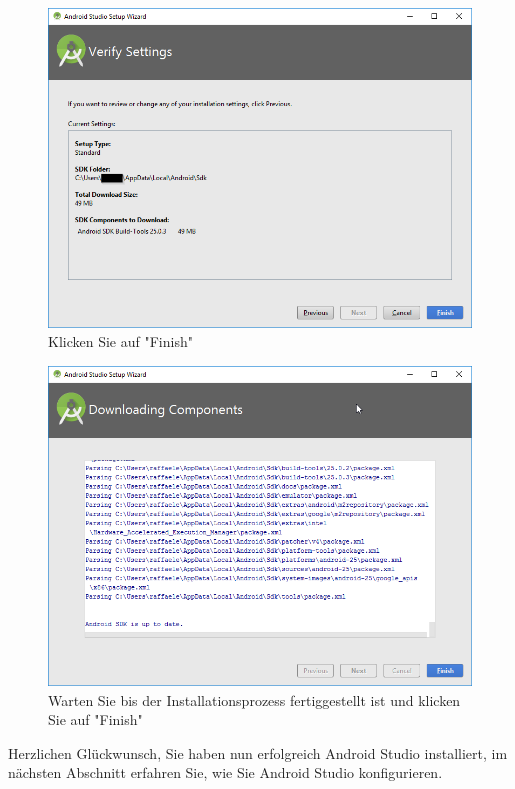 \documentclass[a4paper,10pt,xetex]{article}
\begin{document}
\begin{figure}
  \centering
  \includegraphics[width=\textwidth]{Installation/1-13}
  \caption{Klicken Sie auf "Finish"}
\end{figure}

\begin{figure}
  \centering
  \includegraphics[width=\textwidth]{Installation/1-15}
  \caption{Warten Sie bis der Installationsprozess fertiggestellt ist und klicken Sie auf "Finish"}
\end{figure}

Herzlichen Glückwunsch, Sie haben nun erfolgreich Android Studio installiert, im nächsten Abschnitt erfahren Sie, wie Sie Android Studio konfigurieren.
\end{document}
